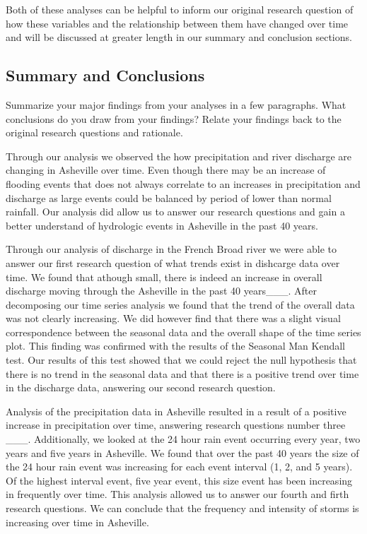 \documentclass[
]{article}
\begin{document}
Both of these analyses can be helpful to inform our original research
question of how these variables and the relationship between them have
changed over time and will be discussed at greater length in our summary
and conclusion sections.

\newpage

\hypertarget{summary-and-conclusions}{%
\subsection{\texorpdfstring{\textbf{Summary and
Conclusions}}{Summary and Conclusions}}\label{summary-and-conclusions}}

Summarize your major findings from your analyses in a few paragraphs.
What conclusions do you draw from your findings? Relate your findings
back to the original research questions and rationale.

Through our analysis we observed the how precipitation and river
discharge are changing in Asheville over time. Even though there may be
an increase of flooding events that does not always correlate to an
increases in precipitation and discharge as large events could be
balanced by period of lower than normal rainfall. Our analysis did allow
us to answer our research questions and gain a better understand of
hydrologic events in Asheville in the past 40 years.

Through our analysis of discharge in the French Broad river we were able
to answer our first research question of what trends exist in dishcarge
data over time. We found that athough small, there is indeed an increase
in overall discharge moving through the Asheville in the past 40
years\_\_\_. After decomposing our time series analysis we found that
the trend of the overall data was not clearly increasing. We did however
find that there was a slight visual correspondence between the seasonal
data and the overall shape of the time series plot. This finding was
confirmed with the results of the Seasonal Man Kendall test. Our results
of this test showed that we could reject the null hypothesis that there
is no trend in the seasonal data and that there is a positive trend over
time in the discharge data, answering our second research question.

Analysis of the precipitation data in Asheville resulted in a result of
a positive increase in precipitation over time, answering research
questions number three \_\_\_. Additionally, we looked at the 24 hour
rain event occurring every year, two years and five years in Asheville.
We found that over the past 40 years the size of the 24 hour rain event
was increasing for each event interval (1, 2, and 5 years). Of the
highest interval event, five year event, this size event has been
increasing in frequently over time. This analysis allowed us to answer
our fourth and firth research questions. We can conclude that the
frequency and intensity of storms is increasing over time in Asheville.
\end{document}
